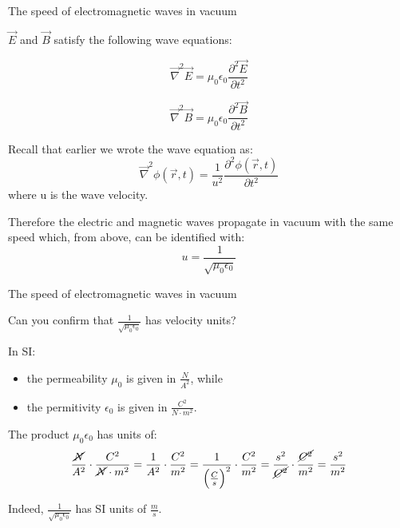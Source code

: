 \begin{frame}{The speed of electromagnetic waves in vacuum}

$\vec{E}$ and $\vec{B}$ satisfy the following wave equations:

\begin{equation*}
  \vec{\nabla}^{2} \vec{E} = \mu_0 \epsilon_0 \frac{\partial^{2} \vec{E}}{\partial t^{2}}
\end{equation*}

\begin{equation*}
  \vec{\nabla}^{2} \vec{B} = \mu_0 \epsilon_0 \frac{\partial^{2} \vec{B}}{\partial t^{2}}
\end{equation*}

Recall that earlier we wrote the wave equation as:
\begin{equation*}
   \vec{\nabla}^{2} \phi(\vec{r}, t) = \frac{1}{u^2} \frac{\partial^{2} \phi(\vec{r}, t)} {\partial t^{2}}
\end{equation*}
where u is the wave velocity.\\

\vspace{0.2cm}

Therefore the electric and magnetic waves propagate in vacuum with the
same speed which, from above, can be identified with:
\begin{equation*}
  u = \frac{1}{\sqrt{\mu_0 \epsilon_0}}
\end{equation*}

\end{frame}

%
%
%
%

\begin{frame}{The speed of electromagnetic waves in vacuum}

Can you confirm that $\frac{1}{\sqrt{\mu_0 \epsilon_0}}$ has velocity units?\\

\vspace{0.4cm}

In SI:
\begin{itemize}
   \item the permeability $\mu_0$ is given in $\frac{N}{A^{2}}$, while
   \item the permitivity $\epsilon_0$ is given in $\frac{C^{2}}{N \cdot m^{2}}$.
\end{itemize}

\vspace{0.2cm}

The product $\mu_0 \epsilon_0$ has units of:
\begin{equation*}
 \frac{\cancel{N}}{A^{2}} \cdot \frac{C^{2}}{\cancel{N} \cdot m^{2}} =
 \frac{1}{A^{2}} \cdot \frac{C^{2}}{m^{2}} =
 \frac{1}{\Big(\frac{C}{s}\Big)^{2}} \cdot \frac{C^{2}}{m^{2}} =
 \frac{s^{2}}{\cancel{C^{2}}} \cdot \frac{\cancel{C^{2}}}{m^{2}} =
 \frac{s^{2}}{m^{2}}
\end{equation*}

\vspace{0.2cm}

Indeed, $\frac{1}{\sqrt{\mu_0 \epsilon_0}}$ has SI units of $\frac{m}{s}$.


\end{frame}

